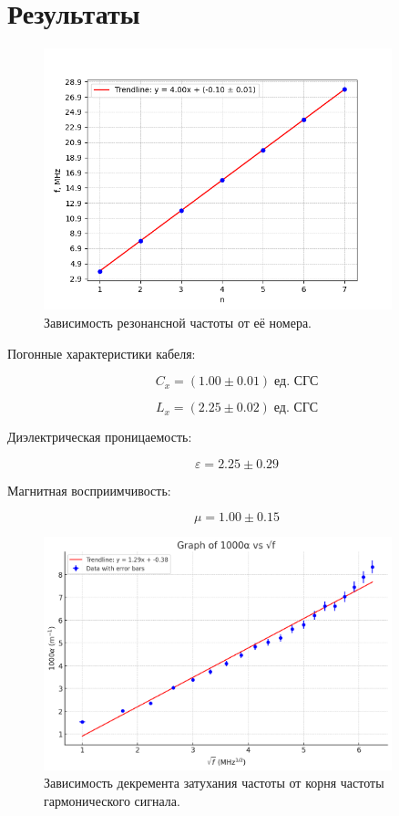 \documentclass[a4paper, 12pt]{article}
\begin{document}
\section*{Результаты}

\begin{figure}[H]
    \captionsetup{position=above, skip=2pt}
    \centering
    \caption{Зависимость резонансной частоты от её номера.}
    \includegraphics[width=0.9\textwidth]{fig1.png}
\end{figure}

Погонные характеристики кабеля:

$$ C_x = (1.00 \pm 0.01) \; \text{ед. СГС} $$

$$ L_x = (2.25 \pm 0.02) \; \text{ед. СГС} $$

Диэлектрическая проницаемость:

$$ \varepsilon = 2.25 \pm 0.29 $$

Магнитная восприимчивость:

$$ \mu = 1.00 \pm 0.15 $$


\begin{figure}[H]
    \captionsetup{position=above, skip=2pt}
    \centering
    \caption{Зависимость декремента затухания частоты от корня частоты гармонического сигнала.}
    \includegraphics[width=0.9\textwidth]{fig2.png}
\end{figure}
\end{document}
